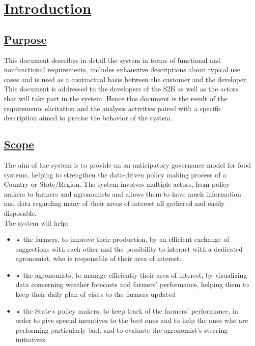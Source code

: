 \section[Introduction]{\hyperlink{toc}{Introduction}}
\label{sec:introduction}
\subsection[Purpose]{\hyperlink{toc}{Purpose}}
	\label{sec:purpose}
	This document describes in detail the system in terms of functional and nonfunctional requirements, includes exhaustive descriptions about typical use cases and is used as a contractual basis between the customer and the developer. This document is addressed to the developers of the S2B as well as the actors that will take part in the system. Hence this document is the result of the requirements elicitation and the analysis activities paired with a specific description aimed to precise the behavior of the system.

	
\subsection[Scope]{\hyperlink{toc}{Scope}}
	The aim of the system is to provide an an anticipatory governance model for food systems, helping to strengthen the data-driven policy making process of a Country or State/Region. The system involves multiple actors, from policy makers to farmers and agronomists and allows them to have much information and data regarding many of their areas of interest all gathered and easily disposable.\\
	
	The system will help:
	
	\begin{itemize}
		\item •	the farmers, to improve their production, by an efficient exchange of suggestions with each other and the possibility to interact with a dedicated agronomist, who is responsible of their area of interest. 
		\item •	the agronomists, to manage efficiently their area of interest, by visualizing data concerning weather forecasts and farmers’ performance, helping them to keep their daily plan of visits to the farmers updated 
		\item •	the State’s policy makers, to keep track of the farmers’ performance, in order to give special incentives to the best ones and to help the ones who are performing particularly bad, and to evaluate the agronomist’s steering initiatives.
	\end{itemize}

